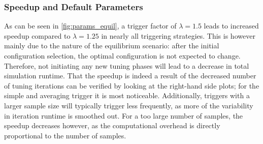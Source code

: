 

\subsubsection{Speedup and Default Parameters}

As can be seen in \autoref{fig:params_equil}, a trigger factor of $\lambda=1.5$ leads to increased speedup compared to $\lambda=1.25$ in nearly all triggering strategies. This is however mainly due to the nature of the equilibrium scenario: after the initial configuration selection, the optimal configuration is not expected to change.
Therefore, not initiating any new tuning phases will lead to a decrease in total simulation runtime. That the speedup is indeed  a result of the decreased number of tuning iterations can be verified by looking at the right-hand side plots; for the simple and averaging trigger it is most noticeable.
Additionally, triggers with a larger sample size will typically trigger less frequently, as more of the variability in iteration runtime is smoothed out. For a too large number of samples, the speedup decreases however, as the computational overhead is directly proportional to the number of samples.


